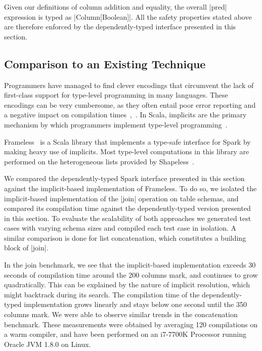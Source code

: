 \noindent
Given our definitions of column addition and equality, the overall |pred| expression is typed as |Column[Boolean]|.
All the safety properties stated above are therefore enforced by the dependently-typed interface presented in this section.

\subsection{Comparison to an Existing Technique}


Programmers have managed to find clever encodings that circumvent the lack of first-class support for type-level programming in many languages.
These encodings can be very cumbersome, as they often entail poor error reporting and a negative impact on compilation times~\citep{mcbride2002faking},~\citep{kiselyov2004strongly}.
In Scala, implicits are the primary mechanism by which programmers implement type-level programming~\citep{odersky2018simplicitly}.

Frameless~\citep{blanvillain2016frameless} is a Scala library that implements a type-safe interface for Spark by making heavy use of implicits.
Most type-level computations in this library are performed on the heterogeneous lists provided by Shapeless~\citep{sabin2011shapeless}.

We compared the dependently-typed Spark interface presented in this section against the implicit-based implementation of Frameless.
To do so, we isolated the implicit-based implementation of the |join| operation on table schemas, and compared its compilation time against the dependently-typed version presented in this section.
To evaluate the scalability of both approaches we generated test cases with varying schema sizes and compiled each test case in isolation.
A similar comparison is done for list concatenation, which constitutes a building block of |join|.

In the join benchmark, we see that the implicit-based implementation exceeds 30 seconds of compilation time around the 200 columns mark, and continues to grow quadratically.
This can be explained by the nature of implicit resolution, which might backtrack during its search.
The compilation time of the dependently-typed implementation grows linearly and stays below one second until the 350 columns mark.
We were able to observe similar trends in the concatenation benchmark.
These measurements were obtained by averaging 120 compilations on a warm compiler, and have been performed on an i7-7700K Processor running Oracle JVM 1.8.0 on Linux.

